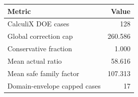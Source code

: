 \begin{tabular}{lr}
\toprule
Metric & Value\\
\midrule
CalculiX DOE cases & 128\\
Global correction cap & 260.586\\
Conservative fraction & 1.000\\
Mean actual ratio & 58.616\\
Mean safe family factor & 107.313\\
Domain-envelope capped cases & 17\\
\bottomrule
\end{tabular}
